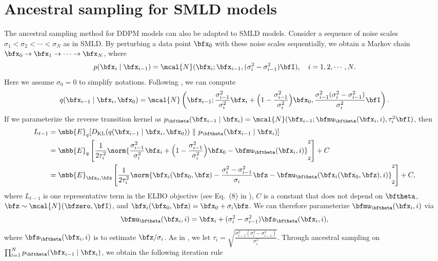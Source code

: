 \section{Ancestral sampling for SMLD models}\label{app:ancestral}
The ancestral sampling method for DDPM models can also be adapted to SMLD models. Consider a sequence of noise scales $\sigma_1 < \sigma_2 < \cdots < \sigma_N$ as in SMLD. By perturbing a data point $\bfx_0$ with these noise scales sequentially, we obtain a Markov chain $\bfx_0 \to \bfx_1 \to \cdots \to \bfx_N$, where
\begin{align*}
    p(\bfx_i \mid \bfx_{i-1}) = \mcal{N}(\bfx_i; \bfx_{i-1}, (\sigma_i^2 - \sigma_{i-1}^2)\bfI), \quad i=1,2,\cdots,N.
\end{align*}
Here we assume $\sigma_0 = 0$ to simplify notations. Following \citet{ho2020denoising}, we can compute
\begin{align*}
    q(\bfx_{i-1} \mid \bfx_i, \bfx_0) = \mcal{N}\left(\bfx_{i-1}; \frac{\sigma_{i-1}^2}{\sigma_{i}^2}\bfx_i + \Big( 1 - \frac{\sigma_{i-1}^2}{\sigma_i^2} \Big)\bfx_0, \frac{\sigma_{i-1}^2 (\sigma_i^2 - \sigma_{i-1}^2)}{\sigma_i^2} \bfI  \right).
\end{align*}
If we parameterize the reverse transition kernel as $p_\bftheta(\bfx_{i-1} \mid \bfx_i) = \mcal{N}(\bfx_{i-1}; \bfmu_\bftheta(\bfx_i, i), \tau^2_i \bfI)$, then
\begin{align*}
    L_{t-1} &= \mbb{E}_q[D_{\text{KL}}(q(\bfx_{i-1} \mid \bfx_i, \bfx_0))~\|~p_\bftheta(\bfx_{i-1} \mid \bfx_i)]\\
    &= \mbb{E}_q\left[\frac{1}{2\tau^2_i} \norm{\frac{\sigma_{i-1}^2}{\sigma_{i}^2}\bfx_i + \Big( 1 - \frac{\sigma_{i-1}^2}{\sigma_i^2} \Big)\bfx_0 - \bfmu_\bftheta(\bfx_i, i)}_2^2 \right] + C\\
    &=\mbb{E}_{\bfx_0, \bfz}\left[\frac{1}{2\tau^2_i} \norm{\bfx_i(\bfx_0, \bfz) - \frac{\sigma_i^2 - \sigma_{i-1}^2}{\sigma_i} \bfz - \bfmu_\bftheta(\bfx_i(\bfx_0, \bfz), i)}_2^2 \right] + C,
\end{align*}
where $L_{t-1}$ is one representative term in the ELBO objective (see Eq.~(8) in \citet{ho2020denoising}), $C$ is a constant that does not depend on $\bftheta$, $\bfz \sim \mcal{N}(\bfzero, \bfI)$, and $\bfx_i(\bfx_0, \bfz) = \bfx_0 + \sigma_i \bfz$. We can therefore parameterize $\bfmu_\bftheta(\bfx_i, i)$ via
\begin{align*}
    \bfmu_\bftheta(\bfx_i, i) = \bfx_i + (\sigma_i^2 - \sigma_{i-1}^2) \bfs_\bftheta(\bfx_i, i),
\end{align*}
where $\bfs_\bftheta(\bfx_i, i)$ is to estimate $\bfz / \sigma_i$. As in \citet{ho2020denoising}, we let $\tau_i = \sqrt{\frac{\sigma_{i-1}^2 (\sigma_i^2 - \sigma_{i-1}^2)}{\sigma_i^2}}$. Through ancestral sampling on $\prod_{i=1}^N p_\bftheta(\bfx_{i-1} \mid \bfx_i)$, we obtain the following iteration rule
